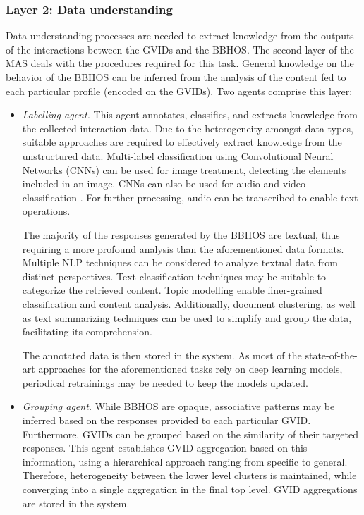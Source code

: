 \subsubsection*{Layer 2: Data understanding}
Data understanding processes are needed to extract knowledge from the outputs of the interactions between the GVIDs and the BBHOS. The second layer of the MAS deals with the procedures required for this task. General knowledge on the behavior of the BBHOS can be inferred from the analysis of the content fed to each particular profile (encoded on the GVIDs). Two agents comprise this layer:
\begin{itemize}
    \item \textit{Labelling agent.} This agent annotates, classifies, and extracts knowledge from the collected interaction data. Due to the heterogeneity amongst data types, suitable approaches are required to effectively extract knowledge from the unstructured data. Multi-label classification using Convolutional Neural Networks (CNNs) \citep{He2015DeepRL,CNNRNN} can be used for image treatment, detecting the elements included in an image. CNNs can also be used for audio and video classification \citep{HersheyCEGJMPPS16}. For further processing, audio can be transcribed \citep{speechrecognition} to enable text operations. 
    
    The majority of the responses generated by the BBHOS are textual, thus requiring a more profound analysis than the aforementioned data formats. Multiple NLP techniques can be considered to analyze textual data from distinct perspectives. Text classification techniques \citep{MIRONCZUK201836} may be suitable to categorize the retrieved content. Topic modelling \citep{pmlr-v15-nallapati11a,Alghamdi2015} enable finer-grained classification and content analysis. Additionally, document clustering, as well as text summarizing techniques \citep{Neto00documentclustering,YOUSEFIAZAR201793,Oikonomakou2005} can be used to simplify and group the data, facilitating its comprehension.
    
    The annotated data is then stored in the system. As most of the state-of-the-art approaches for the aforementioned tasks rely on deep learning models, periodical retrainings may be needed to keep the models updated.
    
    \item \textit{Grouping agent.} While BBHOS are opaque, associative patterns may be inferred based on the responses provided to each particular GVID. Furthermore, GVIDs can be grouped based on the similarity of their targeted responses. This agent establishes GVID aggregation based on this information, using a hierarchical approach ranging from specific to general. Therefore, heterogeneity between the lower level clusters is maintained, while converging into a single aggregation in the final top level. GVID aggregations are stored in the system.
\end{itemize}

